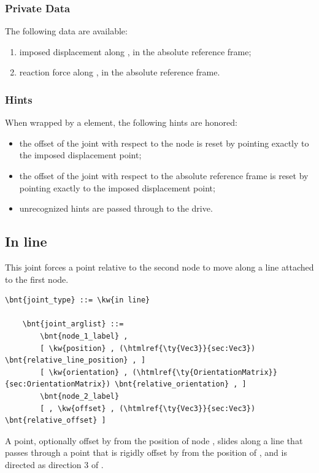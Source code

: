 \subsubsection{Private Data}
The following data are available:
\begin{enumerate}
\item {} imposed displacement along ,
in the absolute reference frame;
\item {} reaction force along ,
in the absolute reference frame.
\end{enumerate}

\subsubsection{Hints}
When wrapped by a  element, the following hints are honored:
\begin{itemize}
\item {} the offset of the joint
with respect to the node is reset by pointing exactly
to the imposed displacement point;
\item {} the offset of the joint
with respect to the absolute reference frame is reset by pointing exactly
to the imposed displacement point;
\item unrecognized hints are passed through to the drive.
\end{itemize}




\subsection{In line}
This joint forces a point relative to the second node to move 
along a line attached to the first node.
\begin{Verbatim}[commandchars=\\\{\}]
    \bnt{joint_type} ::= \kw{in line}

    \bnt{joint_arglist} ::= 
        \bnt{node_1_label} , 
        [ \kw{position} , (\htmlref{\ty{Vec3}}{sec:Vec3}) \bnt{relative_line_position} , ]
        [ \kw{orientation} , (\htmlref{\ty{OrientationMatrix}}{sec:OrientationMatrix}) \bnt{relative_orientation} , ]
        \bnt{node_2_label}
        [ , \kw{offset} , (\htmlref{\ty{Vec3}}{sec:Vec3}) \bnt{relative_offset} ]
\end{Verbatim}
A point, optionally offset by  from the position
of node , slides along a line that passes through a point 
that is rigidly offset by 
from the position of , and is directed as direction 3 
of .



